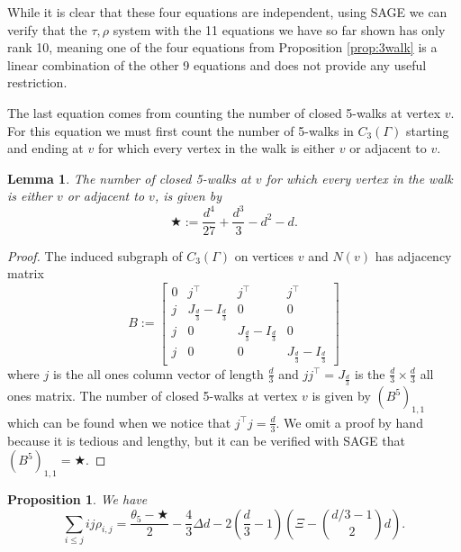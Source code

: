 \documentclass[12pt]{report}
\newtheorem{lem}[thm]{Lemma}
\newtheorem{prop}[thm]{Proposition}
\theoremstyle{definition}
\begin{document}
While it is clear that these four equations are independent, using SAGE we can verify that the $\tau,\rho$ system with the 11 equations we have so far shown has only rank 10, meaning one of the four equations from Proposition \ref{prop:3walk} is a linear combination of the other 9 equations and does not provide any useful restriction.\par
The last equation comes from counting the number of closed 5-walks at vertex $v$. For this equation we must first count the number of 5-walks in $C_3(\Gamma)$ starting and ending at $v$ for which every vertex in the walk is either $v$ or adjacent to $v$.
\clearpage
\begin{lem}
    The number of closed 5-walks at $v$ for which every vertex in the walk is either $v$ or adjacent to $v$, is given by
    \[\bigstar := \frac{d^4}{27}+\frac{d^3}{3} - d^2-d.\]
\end{lem}
\begin{proof}
    The induced subgraph of $C_3(\Gamma)$ on vertices $v$ and $N(v)$ has adjacency matrix
    \[B:=\begin{bmatrix}
        0 & j^\top & j^\top & j^\top \\
        j & J_{\frac{d}{3}}-I_{\frac{d}{3}} & 0 & 0 \\
        j & 0 & J_{\frac{d}{3}}-I_{\frac{d}{3}} & 0 \\
        j & 0 & 0 & J_{\frac{d}{3}}-I_{\frac{d}{3}}
    \end{bmatrix}\]
    where $j$ is the all ones column vector of length $\frac{d}{3}$ and $jj^\top=J_{\frac{d}{3}}$ is the $\frac{d}{3} \times\frac{d}{3}$ all ones matrix. The number of closed 5-walks at vertex $v$ is given by $(B^5)_{1,1}$ which can be found when we notice that $j^\top j=\frac{d}{3}$. We omit a proof by hand because it is tedious and lengthy, but it can be verified with SAGE that $(B^5)_{1,1}=\bigstar$.
\end{proof}
\begin{prop} \label{prop:5walks}
    We have
    \[\sum_{i\leq j}ij\rho_{i,j}=\frac{\theta_5-\bigstar}{2}-\frac{4}{3}\Delta d-2\left(\frac{d}{3}-1 \right)\left(\Xi -\binom{d/3-1}{2}d \right).\]
\end{prop}
\end{document}
